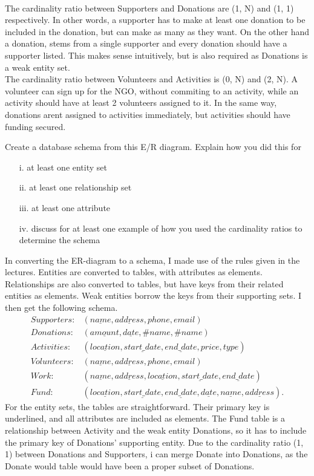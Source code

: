 \documentclass[working, oneside]{../../../Preambles/tuftebook}
\begin{document}
\\
The cardinality ratio between Supporters and Donations are (1, N) and (1, 1) respectively. In other words, a supporter has to make at least one donation to be included in the donation, but can make as many as they want. On the other hand a donation, stems from a single supporter and every donation should have a supporter listed. This makes sense intuitively, but is also required as Donations is a weak entity set.
\\
The cardinality ratio between Volunteers and Activities is (0, N) and (2, N). A volunteer can sign up for the NGO, without commiting to an activity, while an activity should have at least 2 volunteers assigned to it. In the same way, donations arent assigned to activities immediately, but activities should have funding secured.
\begin{exercise}[2]
 Create a database schema from this E/R diagram. Explain how you did this for
 \begin{itemize}
\item[i.] at least one entity set
\item[ii.] at least one relationship set
\item[iii.] at least one attribute
\item[iv.] discuss for at least one example of how you used the cardinality ratios to determine the schema
 \end{itemize}
\end{exercise}
In converting the ER-diagram to a schema, I made use of the rules given in the lectures. Entities are converted to tables, with attributes as elements. Relationships are also converted to tables, but have keys from their related entities as elements. Weak entities borrow the keys from their supporting sets. I then get the following schema.
\begin{align*}
    Supporters :& (\underline{name}, \underline{address}, phone, email) \\
    Donations :& (\underline{amount}, \underline{date}, \#name, \#name) \\
    Activities :& (\underline{location}, \underline{start\_ date},\underline{end\_ date}, price, type) \\
    Volunteers :& (\underline{name}, \underline{address}, phone, email) \\
    Work :& (\underline{name}, \underline{address},\underline{location}, \underline{start\_ date},\underline{end\_ date}) \\
Fund :& (\underline{location}, \underline{start\_date}, \underline{end\_date}, \underline{date}, \underline{name}, \underline{address})
.\end{align*}
For the entity sets, the tables are straightforward. Their primary key is underlined, and all attributes are included as elements. The Fund table is a relationship between Activity and the weak entity Donations, so it has to include the primary key of Donations' supporting entity. Due to the cardinality ratio (1, 1) between Donations and Supporters, i can merge Donate into Donations, as the Donate would table would have been a proper subset of Donations.
\begin{exercise}[3]

\end{exercise}
\end{document}
